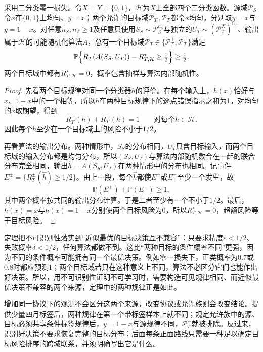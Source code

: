 \begin{theorem}[相同观测下的不可学习性]
\label{thm:transfer-nonidentifiability}
采用二分类零一损失。令$X=Y=\{0,1\}$，$\mathcal H$为$X$上全部四个二分类函数。源域$\mathcal P_S$令$x$在$\{0,1\}$上均匀、$y=x$；两个允许的目标域$\mathcal P_T^{+},\mathcal P_T^{-}$都令$x$均匀，分别取$y=x$与$y=1-x$。对任意$n_S,n_T\geq1$及任意只使用$S_S\sim\mathcal P_S^{n_S}$与独立的$U_T\sim(\mathcal P_T^X)^{n_T}$、输出属于$\mathcal H$的可能随机化算法$A$，总有一个目标域$\mathcal P_T\in\{\mathcal P_T^{+},\mathcal P_T^{-}\}$满足
\[
 \mathbb P\Bigl\{R_T(A(S_S,U_T))-R_{T,\mathcal H}^{\star}\geq\tfrac12\Bigr\}
 \geq\tfrac12 .
\]
两个目标域中都有$R_{T,\mathcal H}^{\star}=0$，概率包含抽样与算法内部随机性。
\end{theorem}
\begin{proof}
先看两个目标规律对同一个分类器$h$的评价。在每个输入上，$h(x)$恰好与$x$、$1-x$中的一个相等，所以$h$在两种目标规律下的逐点错误指示之和为1。对均匀的$x$取期望，得到
\[
 R_T^{+}(h)+R_T^{-}(h)=1\qquad\text{对每个}h\in\mathcal H.
\]
因此每个$h$至少在一个目标域上的风险不小于$1/2$。

再看算法的输出分布。两种情形中，$S_S$的分布相同，$U_T$只含目标输入，而两个目标域的输入分布都是均匀分布，所以$(S_S,U_T)$与算法内部随机数合在一起的联合分布完全相同，输出$\widehat h=A(S_S,U_T)$在两种情形中的分布也相同。记事件$E^{\pm}=\{R_T^{\pm}(\widehat h)\geq1/2\}$。由上一段，每个$\widehat h$都使$E^{+}$或$E^{-}$至少一个发生，故
\[
 \mathbb P(E^{+})+\mathbb P(E^{-})\geq1 ,
\]
其中两个概率按共同的输出分布计算。于是二者至少有一个不小于$1/2$。最后，$h(x)=x$与$h(x)=1-x$分别使两个目标风险为0，所以$R_{T,\mathcal H}^{\star}=0$，超额风险等于目标风险。
\end{proof}

定理把不可识别性落实到“近似最优的目标决策互不兼容”：只要求精度$\varepsilon<1/2$、失败概率$\delta<1/2$，任何算法都做不到。这比“两种目标的条件概率不同”更强，因为不同的条件概率可能拥有同一个最优决策。例如零一损失下，正类概率为0.7或0.8时都应预测1；两个目标域若只在这种意义上不同，算法不必区分它们也能作出好决策。所以，用不可识别性证明不可学习时，需要构造可见规律相同、而近似最优决策不兼容的两个来源，定理中的两种规律正是如此。

增加同一协议下的观测不会区分这两个来源，改变协议或允许族则会改变结论。提供少量四月标签后，两种规律在第一个带标签样本上就不同；规定允许族中的源、目标必须共享条件标签规律后，$y=1-x$与源规律不同，$\mathcal P_T^{-}$就被排除。反过来，识别好决策不要求恢复完整的目标分布：后面每条正面路线只需要一种足以确定目标风险排序的跨域联系，并须明确写出它是什么。

